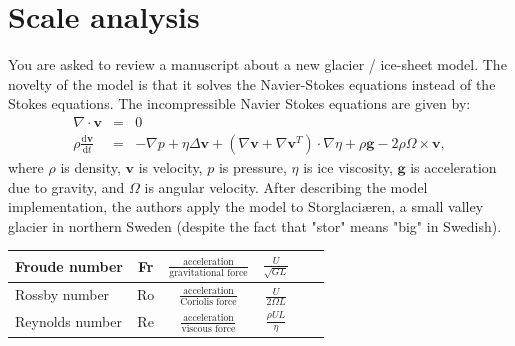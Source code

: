 \documentclass[parskip=half]{scrartcl}
\begin{document}
\section{Scale analysis}

You are asked to review a manuscript about a new glacier / ice-sheet model. The novelty of the model is that it solves the Navier-Stokes equations instead of the Stokes equations. The incompressible Navier Stokes equations are given by:
\begin{eqnarray}
  \nabla \cdot \bm{v} & = & 0 \\
  \rho \frac{\mathrm{d}\bm{v}}{\mathrm{d}t} & = & - \nabla p + \eta \Delta \bm{v} + \left( \nabla \bm{v} + \nabla \bm{v}^T\right) \cdot \nabla \eta + \rho \bm{g} - 2\rho\Omega\times \bm{v},
\end{eqnarray}
where $\rho$ is density, $\bm{v}$ is velocity, $p$ is pressure, $\eta$ is ice viscosity, $\bm{g}$ is acceleration due to gravity, and $\Omega$ is angular velocity. After describing the model implementation, the authors apply the model to Storglaci{\ae}ren, a small valley glacier in northern Sweden (despite the fact that "stor" means "big" in Swedish). 

\begin{center}
\begin{tabular}{lccccc}
\hline
Froude number & Fr & $\frac{\text{acceleration}}{\text{gravitational force}}$ & $\frac{U}{\sqrt{GL}}$ \\[.25em]
\hline
Rossby number & Ro & $\frac{\text{acceleration}}{\text{Coriolis force}}$ & $\frac{U}{2 \Omega L}$   \\[.25em]
\hline
Reynolds number & Re & $\frac{\text{acceleration}}{\text{viscous force}}$ & $\frac{\rho U L}{\eta}$ \\[.25em]
\hline
\end{tabular}        
\end{center}
\end{document}

